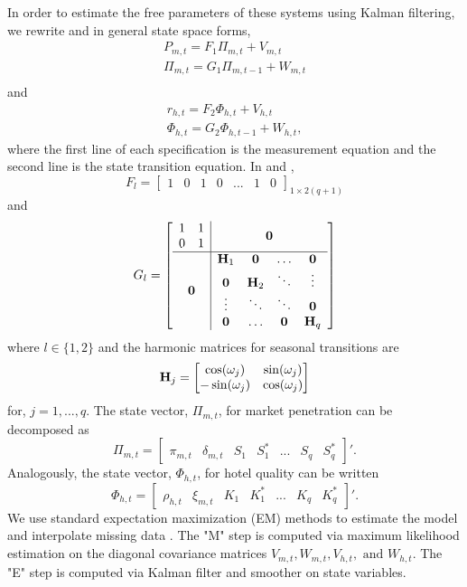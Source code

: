 \documentclass[mksc,blindrev]{informs3} %
\begin{document}
In order to estimate the free parameters of these systems using Kalman filtering, we rewrite  and  in general state space forms,
\begin{equation}\label{eq:penetration_dlm_ssm}
\begin{split}
P_{m,t} = F_1\Pi_{m,t}+V_{m,t} \\
\Pi_{m,t} = G_1\Pi_{m,t-1}+W_{m,t} \\
\end{split}
\end{equation}
and
\begin{equation}\label{eq:ratings_dlm_ssm}
\begin{split}
r_{h,t} = F_2\Phi_{h,t}+V_{h,t} \\
\Phi_{h,t} = G_2\Phi_{h,t-1}+W_{h,t},
\end{split}
\end{equation}
where the first line of each specification is the measurement equation and the second line is the state transition equation. In  and , 
$$
F_l=\begin{bmatrix}
1 & 0 & 1 & 0 &...& 1 & 0
\end{bmatrix}_{1\times 2(q+1)}
$$ and 
$$
G_l=
\left[
\begin{array}{c|c}
\begin{matrix}
1&1\\		
0&1
\end{matrix}& \bold{0} \\
\hline
\bold{0} & \begin{matrix}
\bold{H}_1 & \bold{0} & \dots& \bold{0} \\
\bold{0} & \bold{H}_2 & \ddots & \vdots \\
\vdots &\ddots & \ddots & \bold{0} \\
\bold{0} &\dots & \bold{0} & \bold{H}_q
\end{matrix}
\end{array}
\right]
$$
where $l\in \{ 1, 2 \}$ and the harmonic matrices for seasonal transitions are
$$
\bold{H}_j=
\begin{bmatrix}
\cos(\omega_j) & \sin(\omega_j) \\
-\sin(\omega_j) & \cos(\omega_j)
\end{bmatrix}
$$
for, $j=1,...,q$. The state vector, $\Pi_{m,t}$, for market penetration can be decomposed as 
$$
\Pi_{m,t} = \begin{bmatrix}
\pi_{m, t} & \delta_{m,t} & S_1 & S_1^{*} & ... & S_q&S_q^{*}
\end{bmatrix}'.
$$
Analogously, the state vector, $\Phi_{h,t}$, for hotel quality can be written 
$$
\Phi_{h,t} = \begin{bmatrix}
\rho_{h, t} & \xi_{m,t} & K_1 & K_1^{*} & ... & K_q&K_q^{*}
\end{bmatrix}'.
$$
We use standard expectation maximization (EM) methods to estimate the model and interpolate missing data . The "M" step is computed via maximum likelihood estimation on the diagonal covariance matrices $V_{m,t}, W_{m,t}, V_{h,t}, \text{ and }W_{h,t}$. The "E" step is computed via Kalman filter and smoother on state variables.
\end{document}
